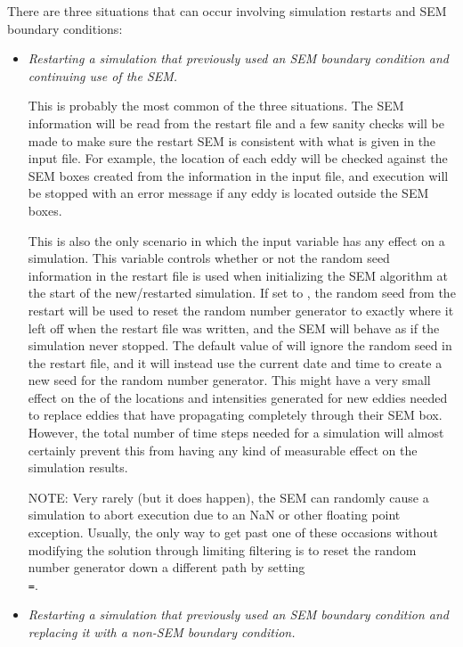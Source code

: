 \noindent
There are three situations that can occur involving simulation restarts and SEM
boundary conditions:
%
\begin{itemize}
  \item \textit{Restarting a simulation that previously used an SEM boundary
    condition and continuing use of the SEM.}
     
    This is probably the most common of the three situations.
    The SEM information will be read from the restart file and a few sanity
    checks will be made to make sure the restart SEM is consistent with what is
    given in the input file.
    For example, the location of each eddy will be checked against the SEM boxes
    created from the information in the input file, and execution will be
    stopped with an error message if any eddy is located outside the SEM boxes.

    This is also the only scenario in which the input variable
    has any effect on a simulation.
    This variable controls whether or not the random seed information in the
    restart file is used when initializing the SEM algorithm at the start of
    the new\slash restarted simulation.
    If set to \tru, the random seed from the restart will be used to reset the
    random number generator to exactly where it left off when the restart file
    was written, and the SEM will behave as if the simulation never stopped.
    The default value of \fls{} will ignore the random seed in the restart file,
    and it will instead use the current date and time to create a new
     seed for the random number generator.
    This might have a very small effect on the  of the
    locations and intensities generated for new eddies needed to replace eddies
    that have propagating completely through their SEM box.
    However, the total number of time steps needed for a simulation will almost
    certainly prevent this from having any kind of measurable effect on the
    simulation results.

    NOTE: Very rarely (but it does happen), the SEM can randomly cause a
    simulation to abort execution due to an NaN or other floating point
    exception.
    Usually, the only way to get past one of these occasions without modifying
    the solution through limiting \andor filtering is to reset the random
    number generator down a different path by setting
    \\ %
    \texttt{=}\fls{}.
  \item \textit{Restarting a simulation that previously used an SEM boundary
    condition and replacing it with a non-SEM boundary condition.}
     

\end{itemize}
